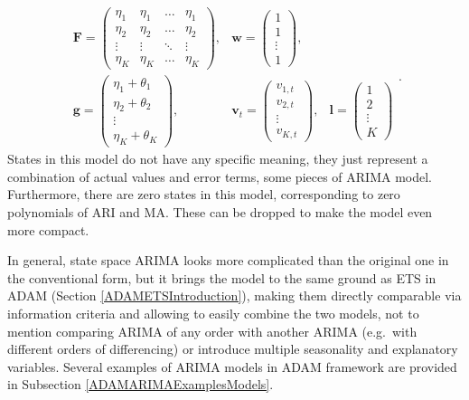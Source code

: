 \documentclass[
]{book}
\theoremstyle{definition}
\theoremstyle{definition}
\theoremstyle{definition}
\theoremstyle{definition}
\theoremstyle{remark}
\begin{document}
\begin{equation}
  \begin{aligned}
    \mathbf{F} = \begin{pmatrix} \eta_1 & \eta_1 & \dots & \eta_1 \\ \eta_2 & \eta_2 & \dots & \eta_2 \\ \vdots & \vdots & \ddots & \vdots \\ \eta_K & \eta_K & \dots & \eta_K \end{pmatrix}, & \mathbf{w} = \begin{pmatrix} 1 \\ 1 \\ \vdots \\ 1 \end{pmatrix}, \\
    \mathbf{g} = \begin{pmatrix} \eta_1 + \theta_1 \\ \eta_2 + \theta_2 \\ \vdots \\ \eta_K + \theta_K \end{pmatrix}, & \mathbf{v}_{t} = \begin{pmatrix} v_{1,t} \\ v_{2,t} \\ \vdots \\ v_{K,t} \end{pmatrix}, & \mathbf{l} = \begin{pmatrix} 1 \\ 2 \\ \vdots \\ K \end{pmatrix}
  \end{aligned}.
  \label{eq:ADAMARIMAMatrices}
\end{equation}
States in this model do not have any specific meaning, they just represent a combination of actual values and error terms, some pieces of ARIMA model. Furthermore, there are zero states in this model, corresponding to zero polynomials of ARI and MA. These can be dropped to make the model even more compact.

In general, state space ARIMA looks more complicated than the original one in the conventional form, but it brings the model to the same ground as ETS in ADAM (Section \ref{ADAMETSIntroduction}), making them directly comparable via information criteria and allowing to easily combine the two models, not to mention comparing ARIMA of any order with another ARIMA (e.g.~with different orders of differencing) or introduce multiple seasonality and explanatory variables. Several examples of ARIMA models in ADAM framework are provided in Subsection \ref{ADAMARIMAExamplesModels}.
\end{document}
